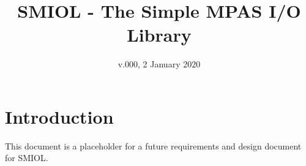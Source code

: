 \documentclass[11pt]{report}
\begin{document}
\title{SMIOL - The Simple MPAS I/O Library}
\date{v.000, 2 January 2020}

\maketitle

\chapter{Introduction}
\label{chap:intro}

This document is a placeholder for a future requirements and design document for SMIOL.
\end{document}

